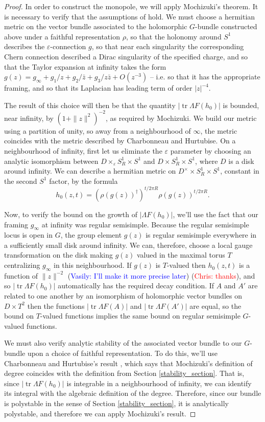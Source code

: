 \documentclass[11pt, oneside, reqno]{amsart}
\theoremstyle{definition} \newtheorem{definition}{Definition}[section]
\theoremstyle{definition} \newtheorem{remark}[definition]{Remark}
\theoremstyle{definition} \newtheorem{remarks}[definition]{Remarks}
\theoremstyle{definition} \newtheorem{question}[definition]{Question}
\theoremstyle{definition} \newtheorem*{note}{Note}
\theoremstyle{definition} \newtheorem{example}[definition]{Example}
\theoremstyle{definition} \newtheorem{examples}[definition]{Examples}
\newcommand{\eps}{\varepsilon}
\DeclareMathOperator{\tr}{tr}
\newcommand{\chris}[1]{(\textcolor{red}{Chris: #1})}
\newcommand{\vasily}[1]{(\textcolor{blue}{Vasily: #1})}
\begin{document}
\begin{proof}
In order to construct the monopole, we will apply Mochizuki's theorem.  It is necessary to verify that the assumptions of \cite[Corollary 3.13]{MochizukiKH} hold.  We must choose a hermitian metric on the vector bundle associated to the holomorphic $G$-bundle constructed above under a faithful representation $\rho$, so that the holonomy around $S^1$ describes the $\eps$-connection $g$, so that near each singularity the corresponding Chern connection described a Dirac singularity of the specified charge, and so that the Taylor expansion at infinity takes the form $g(z) = g_\infty +  g_1/z + g_2/\bar{z} + g_3/z \bar{z} + O(z^{-3})$ -- i.e. so that it has the appropriate framing, and so that its Laplacian has leading term of order $|z|^{-4}$. 

The result of this choice will then be that the quantity $|\tr \Lambda F(h_0)|$ is bounded, near infinity, by $(1 +\|z\|^2)^{-2}$, as required by Mochizuki.  We build our metric using a partition of unity, so away from a neighbourhood of $\infty$, the metric coincides with the metric described by Charbonneau and Hurtubise.  On a neighbourhood of infinity, first let us eliminate the $\eps$ parameter by choosing an analytic isomorphism between $D \times_\eps S^1_R \times S^1$ and $D \times S^1_R \times S^1$, where $D$ is a disk around infinity.  We can describe a hermitian metric on $D^\times \times S^1_R \times S^1$, constant in the second $S^1$ factor, by the formula
\[h_0(z,t) = (\rho(g(z))^\dagger)^{t/2\pi R}\rho(g(z))^{t/2\pi R}.\]

Now, to verify the bound on the growth of $|\Lambda F(h_0)|$, we'll use the fact that our framing $g_\infty$ at infinity was regular semisimple.  Because the regular semisimple locus is open in $G$, the group element $g(z)$ is regular semisimple everywhere in a sufficiently small disk around infinity.  We can, therefore, choose a local gauge transformation on the disk making $g(z)$ valued in the maximal torus $T$ centralizing $g_\infty$ in this neighbourhood.  If $g(z)$ is $T$-valued then $h_0(z,t)$ is a function of $\|z\|^{-2}$ \vasily{I'll make it more precise later} \chris{thanks}, and so $|\tr \Lambda F(h_0)|$ automatically has the required decay condition.  If $A$ and $A'$ are related to one another by an isomorphism of holomorphic vector bundles on $D \times T^2$ then the functions $|\tr \Lambda F(A)|$ and $|\tr \Lambda F(A')|$ are equal, so the bound on $T$-valued functions implies the same bound on regular semisimple $G$-valued functions.

We must also verify analytic stability of the associated vector bundle to our $G$-bundle upon a choice of faithful representation.  To do this, we'll use Charbonneau and Hurtubise's result \cite[Lemma 4.5]{CharbonneauHurtubise}, which says that Mochizuki's definition of degree coincides with the definition from Section \ref{stability_section}.  That is, since $|\tr \Lambda F(h_0)|$ is integrable in a neighbourhood of infinity, we can identify its integral with the algebraic definition of the degree.  Therefore, since our bundle is polystable in the sense of Section \ref{stability_section}, it is analytically polystable, and therefore we can apply Mochizuki's result.


\end{proof}
\end{document}
